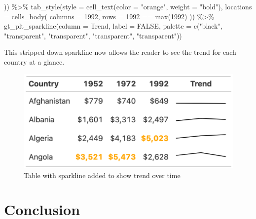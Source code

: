 \documentclass[
]{book}
\newenvironment{Shaded}{\begin{snugshade}}{\end{snugshade}}
\newcommand{\AttributeTok}[1]{\textcolor[rgb]{0.77,0.63,0.00}{#1}}
\newcommand{\ConstantTok}[1]{\textcolor[rgb]{0.00,0.00,0.00}{#1}}
\newcommand{\FunctionTok}[1]{\textcolor[rgb]{0.00,0.00,0.00}{#1}}
\newcommand{\NormalTok}[1]{#1}
\newcommand{\SpecialCharTok}[1]{\textcolor[rgb]{0.00,0.00,0.00}{#1}}
\newcommand{\StringTok}[1]{\textcolor[rgb]{0.31,0.60,0.02}{#1}}
\begin{document}
\begin{Shaded}
\begin{Highlighting}[]
\NormalTok{            )) }\SpecialCharTok{\%\textgreater{}\%} 
  \FunctionTok{tab\_style}\NormalTok{(}\AttributeTok{style =} \FunctionTok{cell\_text}\NormalTok{(}\AttributeTok{color =} \StringTok{"orange"}\NormalTok{,}
                              \AttributeTok{weight =} \StringTok{"bold"}\NormalTok{),}
            \AttributeTok{locations =} \FunctionTok{cells\_body}\NormalTok{(}
              \AttributeTok{columns =} \StringTok{\textasciigrave{}}\AttributeTok{1992}\StringTok{\textasciigrave{}}\NormalTok{,}
              \AttributeTok{rows =} \StringTok{\textasciigrave{}}\AttributeTok{1992}\StringTok{\textasciigrave{}} \SpecialCharTok{==} \FunctionTok{max}\NormalTok{(}\StringTok{\textasciigrave{}}\AttributeTok{1992}\StringTok{\textasciigrave{}}\NormalTok{)}
\NormalTok{            )) }\SpecialCharTok{\%\textgreater{}\%} 
  \FunctionTok{gt\_plt\_sparkline}\NormalTok{(}\AttributeTok{column =}\NormalTok{ Trend,}
                   \AttributeTok{label =} \ConstantTok{FALSE}\NormalTok{,}
                   \AttributeTok{palette =} \FunctionTok{c}\NormalTok{(}\StringTok{"black"}\NormalTok{, }\StringTok{"transparent"}\NormalTok{, }\StringTok{"transparent"}\NormalTok{, }\StringTok{"transparent"}\NormalTok{, }\StringTok{"transparent"}\NormalTok{))}
\end{Highlighting}
\end{Shaded}

This stripped-down sparkline now allows the reader to see the trend for each country at a glance.

\begin{figure}
\includegraphics[width=1\linewidth]{nostarch/temp/F05011} \caption{Table with sparkline added to show trend over time}\label{fig:unnamed-chunk-40}
\end{figure}

\hypertarget{conclusion}{%
\section*{Conclusion}\label{conclusion}}
\end{document}
